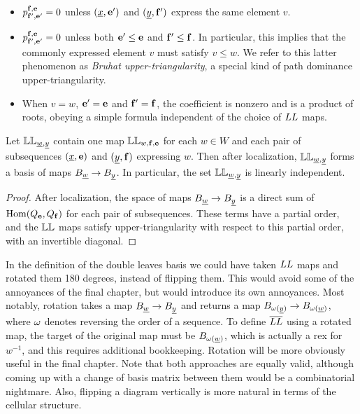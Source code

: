 \begin{itemize} \item $p^{{\mathbf f},{\mathbf e}}_{{\mathbf f}',{\mathbf e}'}=0$ unless $({\underline{x}},{\mathbf e}')$ and $({\underline{y}},{\mathbf f}')$ express the same element $v$.
\item $p^{{\mathbf f},{\mathbf e}}_{{\mathbf f}',{\mathbf e}'}=0$ unless both ${\mathbf e}'
\le {\mathbf e}$ and ${\mathbf f}' \le {\mathbf f}$. In particular, this implies that the commonly expressed element $v$ must satisfy $v \le w$. We refer to this latter phenomenon as \emph{Bruhat
upper-triangularity}, a special kind of path dominance upper-triangularity.
\item When $v=w$, ${\mathbf e}'={\mathbf e}$ and ${\mathbf f}'={\mathbf f}$, the coefficient is nonzero and is a product of roots, obeying a
simple formula independent of the choice of $LL$ maps. \end{itemize}

\begin{prop} Let $\mathbb{LL}_{{\underline{w}},{\underline{y}}}$ contain one map $\mathbb{LL}_{w,{\mathbf f},{\mathbf e}}$ for each $w \in W$ and each pair of subsequences $({\underline{x}},{\mathbf e})$ and $({\underline{y}},{\mathbf f})$ expressing $w$. Then after localization, $\mathbb{LL}_{{\underline{w}},{\underline{y}}}$ forms a basis of maps $B_{\underline{w}} \rightarrow B_{\underline{y}}$. In particular, the set $\mathbb{LL}_{{\underline{w}},{\underline{y}}}$ is linearly independent. \label{LLLalocalbasis} \end{prop}

\begin{proof} After localization, the space of maps $B_{\underline{w}} \rightarrow B_{\underline{y}}$ is a direct sum of $\operatorname{Hom}(Q_{\mathbf e},Q_{\mathbf f})$ for each pair of subsequences. These terms have a partial order, and the
$\mathbb{LL}$ maps satisfy upper-triangularity with respect to this partial order, with an invertible diagonal. \end{proof}

\begin{remark} In the definition of the double leaves basis we could have taken $LL$ maps and rotated them 180 degrees, instead of flipping them. This would avoid some of the annoyances of the final
chapter, but would introduce its own annoyances. Most notably, rotation takes a map $B_{\underline{w}} \rightarrow B_{\underline{y}}$ and returns a map $B_{\omega({\underline{y}})} \rightarrow B_{\omega({\underline{w}})}$, where $\omega$ denotes reversing the order of a
sequence. To define $\overline{LL}$ using a rotated map, the target of the original map must be $B_{\omega({\underline{w}})}$, which is actually a rex for $w^{-1}$, and this requires additional bookkeeping.
Rotation will be more obviously useful in the final chapter. Note that both approaches are equally valid, although coming up with a change of basis matrix between them would be a combinatorial nightmare. Also, flipping a diagram vertically is more natural in terms of the cellular structure.\end{remark}

